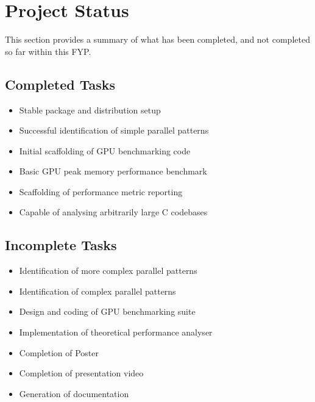 
\section{Project Status}

This section provides a summary of what has been completed, and not completed so far within this FYP.


\subsection{Completed Tasks}

\begin{itemize}
\item Stable package and distribution setup
\item Successful identification of simple parallel patterns
\item Initial scaffolding of GPU benchmarking code
\item Basic GPU peak memory performance benchmark
\item Scaffolding of performance metric reporting
\item Capable of analysing arbitrarily large C codebases
\end{itemize}


\subsection{Incomplete Tasks}

\begin{itemize}
\item Identification of more complex parallel patterns
\item Identification of complex parallel patterns
\item Design and coding of GPU benchmarking suite
\item Implementation of theoretical performance analyser
\item Completion of Poster
\item Completion of presentation video
\item Generation of documentation
\end{itemize}



